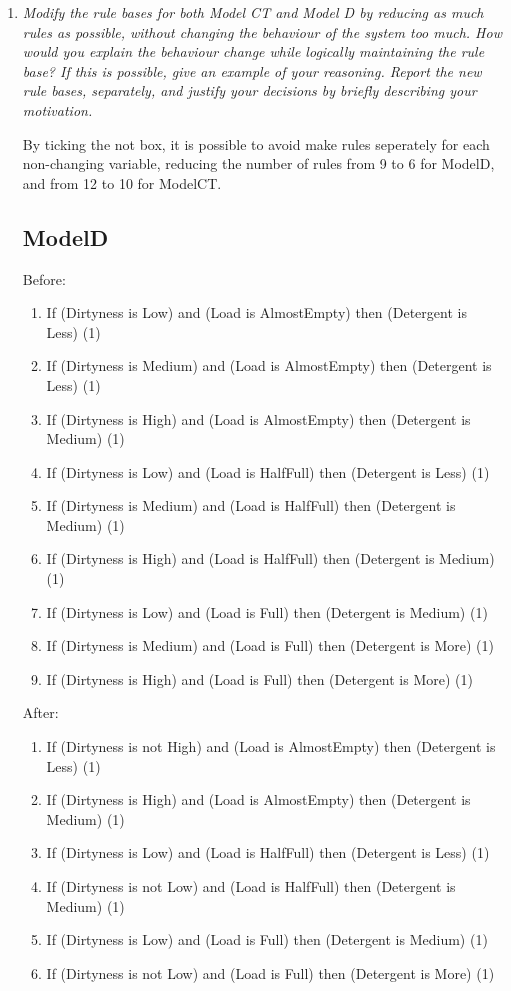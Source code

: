 \documentclass[11pt]{article}
\begin{document}
\begin{enumerate}[label=(\alph*)]
  \item \textit{Modify the rule bases for both Model CT and Model D by reducing
  as much rules as possible, without changing the behaviour of the system too
  much. How would you explain the behaviour change while logically maintaining
  the rule base? If this is possible, give an example of your reasoning. Report
  the new rule bases, separately, and justify your decisions by briefly
  describing your motivation.}

  By ticking the not box, it is possible to avoid make rules seperately for each
  non-changing variable, reducing the number of rules from 9 to 6 for ModelD,
  and from 12 to 10 for ModelCT.

  \subsection*{ModelD}

  Before:
  \begin{enumerate}[label=(\arabic*)]
    \item If (Dirtyness is Low) and (Load is AlmostEmpty) then (Detergent is
    Less) (1)
    \item If (Dirtyness is Medium) and (Load is AlmostEmpty) then (Detergent is
    Less) (1)
    \item If (Dirtyness is High) and (Load is AlmostEmpty) then (Detergent is
    Medium) (1)
    \item If (Dirtyness is Low) and (Load is HalfFull) then (Detergent is Less)
    (1)
    \item If (Dirtyness is Medium) and (Load is HalfFull) then (Detergent is
    Medium) (1)
    \item If (Dirtyness is High) and (Load is HalfFull) then (Detergent is
    Medium) (1)
    \item If (Dirtyness is Low) and (Load is Full) then (Detergent is Medium)
    (1)
    \item If (Dirtyness is Medium) and (Load is Full) then (Detergent is More)
    (1)
    \item If (Dirtyness is High) and (Load is Full) then (Detergent is More) (1)
  \end{enumerate}

  After:
  \begin{enumerate}[label=(\arabic*)]
    \item If (Dirtyness is not High) and (Load is AlmostEmpty) then (Detergent
    is Less) (1)
    \item If (Dirtyness is High) and (Load is AlmostEmpty) then (Detergent is
    Medium) (1)
    \item If (Dirtyness is Low) and (Load is HalfFull) then (Detergent is Less)
    (1)
    \item If (Dirtyness is not Low) and (Load is HalfFull) then (Detergent
    is Medium) (1)
    \item If (Dirtyness is Low) and (Load is Full) then (Detergent is Medium)
    (1)
    \item If (Dirtyness is not Low) and (Load is Full) then (Detergent is More)
    (1)
  \end{enumerate}


\end{enumerate}
\end{document}
